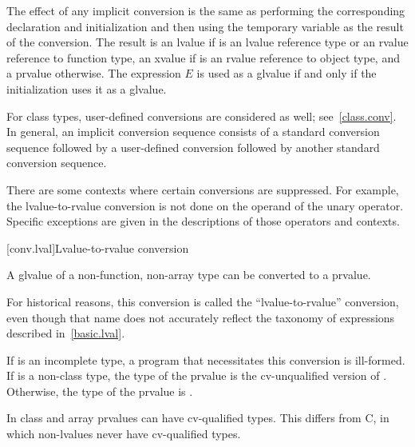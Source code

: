 \pnum
The effect of any implicit
conversion is the same as performing the corresponding declaration and initialization
and then using the temporary variable as the result of the conversion.
The result is an lvalue if  is an lvalue reference
type or an rvalue reference to function type,
an xvalue if  is an rvalue reference to object type,
and a prvalue otherwise. The expression $E$
is used as a glvalue if and only if the initialization uses it as a glvalue.

\pnum
\begin{note}
For class types, user-defined conversions are considered as well;
see~\ref{class.conv}. In general, an implicit conversion
sequence consists of a standard conversion
sequence followed by a user-defined conversion followed by another
standard conversion sequence.
\end{note}

\pnum
\begin{note}
There are some contexts where certain conversions are suppressed. For
example, the lvalue-to-rvalue conversion is not done on the operand of
the unary \tcode{\&} operator. Specific exceptions are given in the
descriptions of those operators and contexts.
\end{note}

[conv.lval]{Lvalue-to-rvalue conversion}

\pnum
{}%
%
A glvalue of a non-function, non-array type 
can be converted to
a prvalue.
\begin{footnote}
For historical reasons, this conversion is called the ``lvalue-to-rvalue''
conversion, even though that name does not accurately reflect the taxonomy
of expressions described in~\ref{basic.lval}.
\end{footnote}
If  is an incomplete type, a
program that necessitates this conversion is ill-formed. If 
is a non-class type, the type of the prvalue is
the cv-unqualified version of . Otherwise, the type of the
prvalue is .
\begin{footnote}
In \Cpp{} class and array prvalues can have cv-qualified types.
This differs from C, in which non-lvalues never have
cv-qualified types.
\end{footnote}

